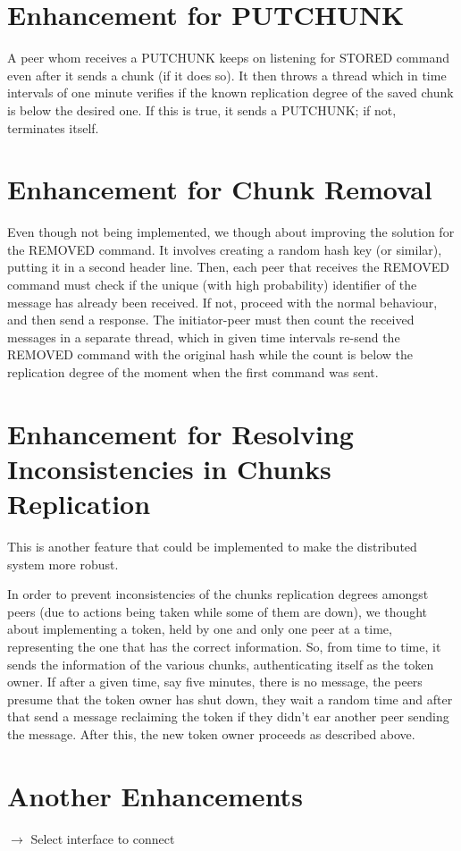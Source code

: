 \documentclass[10pt,a4paper,final]{report}
\begin{document}
\section*{Enhancement for PUTCHUNK}

A peer whom receives a PUTCHUNK keeps on listening for STORED command even after it sends a chunk (if it does so). It then throws a thread which in time intervals of one minute verifies if the known replication degree of the saved chunk is below the desired one. If this is true, it sends a PUTCHUNK; if not, terminates itself.

\section*{Enhancement for Chunk Removal}

Even though not being implemented, we though about improving the solution for the REMOVED command. It involves creating a random hash key (or similar), putting it in a second header line. Then, each peer that receives the REMOVED command must check if the unique (with high probability) identifier of the message has already been received. If not, proceed with the normal behaviour, and then send a response. The initiator-peer must then count the received messages in a separate thread, which in given time intervals re-send the REMOVED command with the original hash while the count is below the replication degree of the moment when the first command was sent.

\section*{Enhancement for Resolving Inconsistencies in Chunks Replication}

This is another feature that could be implemented to make the distributed system more robust. 

In order to prevent inconsistencies of the chunks replication degrees amongst peers (due to actions being taken while some of them are down), we thought about implementing a token, held by one and only one peer at a time, representing the one that has the correct information. So, from time to time, it sends the information of the various chunks, authenticating itself as the token owner. If after a given time, say five minutes, there is no message, the peers presume that the token owner has shut down, they wait a random time and after that send a message reclaiming the token if they didn't ear another peer sending the message. After this, the new token owner proceeds as described above.

\section*{Another Enhancements}
$\rightarrow$ Select interface to connect
\end{document}

